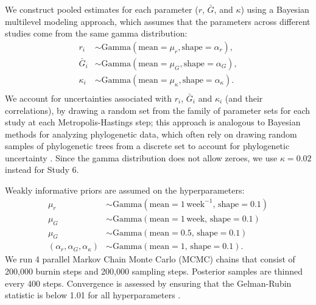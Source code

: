 \documentclass[12pt]{article}
\begin{document}
We construct pooled estimates for each parameter ($r$, $\bar G$, and $\kappa$) using a Bayesian multilevel modeling approach, which assumes that the parameters across different studies come from the same gamma distribution:
\begin{equation}
\begin{aligned}
r_i &\sim \mathrm{Gamma}(\mathrm{mean}=\mu_r, \mathrm{shape}=\alpha_r),\\
\bar{G}_i &\sim \mathrm{Gamma}(\mathrm{mean}=\mu_G, \mathrm{shape}=\alpha_G),\\
\kappa_i &\sim \mathrm{Gamma}(\mathrm{mean}=\mu_\kappa, \mathrm{shape}=\alpha_\kappa).\\
\end{aligned}
\end{equation}
We account for uncertainties associated with $r_i$, $\bar G_i$ and $\kappa_i$ (and their correlations), by drawing a random set from the family of parameter sets for each study at each Metropolis-Hastings step;
this approach is analogous to Bayesian methods for analyzing phylogenetic data, which often rely on drawing random samples of phylogenetic trees from a discrete set to account for phylogenetic uncertainty \citep{pagel2004bayesian,bedford2014integrating}.
Since the gamma distribution does not allow zeroes, we use $\kappa =0.02$ instead for Study 6.

Weakly informative priors are assumed on the hyperparameters:
\begin{equation}
\begin{aligned}
\mu_r &\sim \mathrm{Gamma}(\mathrm{mean}=1\,\mathrm{week}^{-1},\,\mathrm{shape}=0.1)\\
\mu_G &\sim \mathrm{Gamma}(\mathrm{mean}=1\,\mathrm{week},\,\mathrm{shape}=0.1)\\
\mu_G &\sim \mathrm{Gamma}(\mathrm{mean}=0.5,\,\mathrm{shape}=0.1)\\
(\alpha_r, \alpha_G, \alpha_\kappa) &\sim \mathrm{Gamma}(\mathrm{mean}=1,\,\mathrm{shape}=0.1).
\end{aligned}
\end{equation}
We run 4 parallel Markov Chain Monte Carlo (MCMC) chains that consist of 200,000 burnin steps and 200,000 sampling steps.
Posterior samples are thinned every 400 steps.
Convergence is assessed by ensuring that the Gelman-Rubin statistic is below 1.01 for all hyperparameters \citep{gelman1992inference}.

\pagebreak


\end{document}
